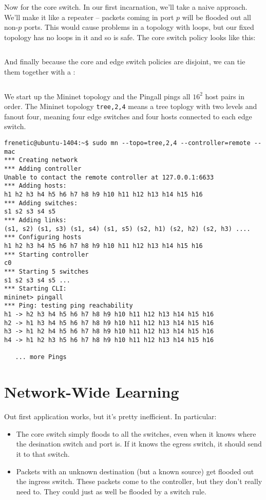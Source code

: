 Now for the core switch.  In our first incarnation, we'll take a naive approach.  We'll make it like
a repeater -- packets coming in port $p$ will be flooded out all non-$p$ ports.  This would cause problems
in a topology with loops, but our fixed topology has no loops in it and so is safe.  The core
switch policy looks like this:

\inputminted[firstline=42,lastline=49]{python}{code/multiswitch_topologies/multiswitch1.py}

And finally because the core and edge switch policies are disjoint, we can tie them together with a 
:

\inputminted[firstline=51,lastline=52]{python}{code/multiswitch_topologies/multiswitch1.py}

We start up the Mininet topology and the Pingall pings all $16^2$ host pairs in order.  The Mininet 
topology \texttt{tree,2,4} means a tree toplogy with two levels and fanout four, meaning four
edge switches and four hosts connected to each edge switch.   

\begin{verbatim}
frenetic@ubuntu-1404:~$ sudo mn --topo=tree,2,4 --controller=remote --mac
*** Creating network
*** Adding controller
Unable to contact the remote controller at 127.0.0.1:6633
*** Adding hosts:
h1 h2 h3 h4 h5 h6 h7 h8 h9 h10 h11 h12 h13 h14 h15 h16
*** Adding switches:
s1 s2 s3 s4 s5
*** Adding links:
(s1, s2) (s1, s3) (s1, s4) (s1, s5) (s2, h1) (s2, h2) (s2, h3) ....
*** Configuring hosts
h1 h2 h3 h4 h5 h6 h7 h8 h9 h10 h11 h12 h13 h14 h15 h16
*** Starting controller
c0
*** Starting 5 switches
s1 s2 s3 s4 s5 ...
*** Starting CLI:
mininet> pingall
*** Ping: testing ping reachability
h1 -> h2 h3 h4 h5 h6 h7 h8 h9 h10 h11 h12 h13 h14 h15 h16
h2 -> h1 h3 h4 h5 h6 h7 h8 h9 h10 h11 h12 h13 h14 h15 h16
h3 -> h1 h2 h4 h5 h6 h7 h8 h9 h10 h11 h12 h13 h14 h15 h16
h4 -> h1 h2 h3 h5 h6 h7 h8 h9 h10 h11 h12 h13 h14 h15 h16

   ... more Pings
\end{verbatim}

\section{Network-Wide Learning}

Out first application works, but it's pretty inefficient.  In particular:

\begin{itemize}
\item The core switch simply floods to all the switches, even when it knows where the desination switch 
and port is.  If it knows the egress switch, it should send it to that switch.  
\item Packets with an unknown destination (but a known source) get flooded out the ingress switch.  
These packets come to the controller, but they don't really need to.  They could just as well be flooded 
by a switch rule.  
\end{itemize}

